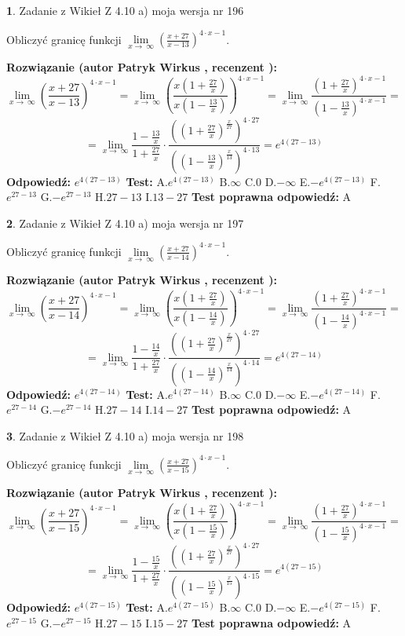 \documentclass[12pt, a4paper]{article}
\theoremstyle{definition} %
\newtheorem{zad}{}
\newcommand{\zadStart}[1]{\begin{zad}#1\newline}
\newcommand{\zadStop}{\end{zad}}
\newcommand{\rozwStart}[2]{\noindent \textbf{Rozwiązanie (autor #1 , recenzent #2): }\newline}
\newcommand{\rozwStop}{\newline}
\newcommand{\odpStart}{\noindent \textbf{Odpowiedź:}\newline}
\newcommand{\odpStop}{\newline}
\newcommand{\testStart}{\noindent \textbf{Test:}\newline}
\newcommand{\testStop}{\newline}
\newcommand{\kluczStart}{\noindent \textbf{Test poprawna odpowiedź:}\newline}
\newcommand{\kluczStop}{\newline}
\begin{document}
\zadStart{Zadanie z Wikieł Z 4.10 a) moja wersja nr 196}


Obliczyć granicę funkcji  $\lim\limits_{x\to\ \infty}(\frac{x+27}{x-13})^{4\cdot x-1}$.
\zadStop
\rozwStart{Patryk Wirkus}{}
$$\lim\limits_{x\to\ \infty}(\frac{x+27}{x-13})^{4\cdot x-1} = \lim\limits_{x\to\ \infty}(\frac{x(1+\frac{27}{x})}{x(1-\frac{13}{x})})^{4\cdot x-1}=\lim\limits_{x\to\ \infty}\frac{(1+\frac{27}{x})^{4\cdot x-1}}{(1-\frac{13}{x})^{4\cdot x-1}}=$$
$$=\lim\limits_{x\to\ \infty}\frac{1-\frac{13}{x}}{1+\frac{27}{x}}\cdot\frac{((1+\frac{27}{x})^{\frac{x}{27}})^{4\cdot27}}{((1-\frac{13}{x})^{\frac{x}{13}})^{4\cdot13}}=e^{4(27-13)}$$
\rozwStop
\odpStart
$e^{4(27-13)}$
\odpStop
\testStart
A.$e^{4(27-13)}$ B.$\infty$ C.$0$ D.$-\infty$ E.$-e^{4(27-13)}$
F.$e^{27-13}$ G.$-e^{27-13}$
H.$27-13$
I.$13-27$
\testStop
\kluczStart
A
\kluczStop



\zadStart{Zadanie z Wikieł Z 4.10 a) moja wersja nr 197}


Obliczyć granicę funkcji  $\lim\limits_{x\to\ \infty}(\frac{x+27}{x-14})^{4\cdot x-1}$.
\zadStop
\rozwStart{Patryk Wirkus}{}
$$\lim\limits_{x\to\ \infty}(\frac{x+27}{x-14})^{4\cdot x-1} = \lim\limits_{x\to\ \infty}(\frac{x(1+\frac{27}{x})}{x(1-\frac{14}{x})})^{4\cdot x-1}=\lim\limits_{x\to\ \infty}\frac{(1+\frac{27}{x})^{4\cdot x-1}}{(1-\frac{14}{x})^{4\cdot x-1}}=$$
$$=\lim\limits_{x\to\ \infty}\frac{1-\frac{14}{x}}{1+\frac{27}{x}}\cdot\frac{((1+\frac{27}{x})^{\frac{x}{27}})^{4\cdot27}}{((1-\frac{14}{x})^{\frac{x}{14}})^{4\cdot14}}=e^{4(27-14)}$$
\rozwStop
\odpStart
$e^{4(27-14)}$
\odpStop
\testStart
A.$e^{4(27-14)}$ B.$\infty$ C.$0$ D.$-\infty$ E.$-e^{4(27-14)}$
F.$e^{27-14}$ G.$-e^{27-14}$
H.$27-14$
I.$14-27$
\testStop
\kluczStart
A
\kluczStop



\zadStart{Zadanie z Wikieł Z 4.10 a) moja wersja nr 198}


Obliczyć granicę funkcji  $\lim\limits_{x\to\ \infty}(\frac{x+27}{x-15})^{4\cdot x-1}$.
\zadStop
\rozwStart{Patryk Wirkus}{}
$$\lim\limits_{x\to\ \infty}(\frac{x+27}{x-15})^{4\cdot x-1} = \lim\limits_{x\to\ \infty}(\frac{x(1+\frac{27}{x})}{x(1-\frac{15}{x})})^{4\cdot x-1}=\lim\limits_{x\to\ \infty}\frac{(1+\frac{27}{x})^{4\cdot x-1}}{(1-\frac{15}{x})^{4\cdot x-1}}=$$
$$=\lim\limits_{x\to\ \infty}\frac{1-\frac{15}{x}}{1+\frac{27}{x}}\cdot\frac{((1+\frac{27}{x})^{\frac{x}{27}})^{4\cdot27}}{((1-\frac{15}{x})^{\frac{x}{15}})^{4\cdot15}}=e^{4(27-15)}$$
\rozwStop
\odpStart
$e^{4(27-15)}$
\odpStop
\testStart
A.$e^{4(27-15)}$ B.$\infty$ C.$0$ D.$-\infty$ E.$-e^{4(27-15)}$
F.$e^{27-15}$ G.$-e^{27-15}$
H.$27-15$
I.$15-27$
\testStop
\kluczStart
A
\kluczStop
\end{document}
